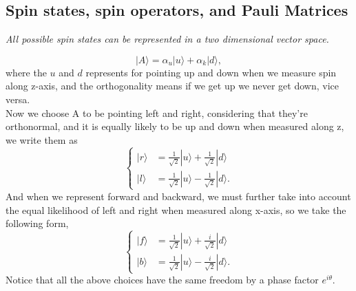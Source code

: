 \documentclass{article}
\newcommand{\be}{\begin{equation}}
\newcommand{\ee}{\end{equation}}
\newcommand{\1}{\left}
\newcommand{\2}{\right}
\newcommand{\ke}{\rangle}
\newcommand{\al}{\alpha}
\begin{document}
\subsection{Spin states, spin operators, and Pauli Matrices}
\textit{All possible spin states can be represented in a two dimensional vector space.}

\be
|A\ke=\al_u|u\ke+\al_k|d\ke,
\ee
where the $u$ and $d$ represents for pointing up and down when we measure spin along z-axis, and the orthogonality means if we get up we never get down, vice versa.\\
Now we choose A to be pointing left and right, considering that they're orthonormal, and it is equally likely to be up and down when measured along z, we write them as
\be\1\{\begin{split}
|r\ke&=\frac1 {\sqrt{2}}|u\ke+\frac1 {\sqrt{2}}|d\ke\\
|l\ke&=\frac1 {\sqrt{2}}|u\ke- \frac1 {\sqrt{2}}|d\ke.
\end{split}\2.\ee
And when we represent forward and backward, we must further take into account the equal likelihood of left and right when measured along x-axis, so we take the following form,
\be\1\{\begin{split}
|f\ke&=\frac1 {\sqrt{2}}|u\ke+\frac i {\sqrt{2}}|d\ke\\
|b\ke&=\frac1 {\sqrt{2}}|u\ke- \frac i {\sqrt{2}}|d\ke.
\end{split}\2.\ee
Notice that all the above choices have the same freedom by a phase factor $e^{i\theta}$.
\end{document}
